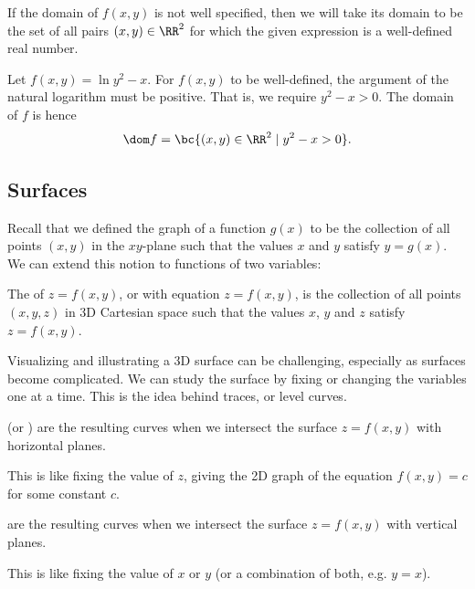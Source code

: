If the domain of $f(x, y)$ is not well specified, then we will take its domain to be the set of all pairs $(x, y) \in \RR^2$ for which the given expression is a well-defined real number.

\begin{example}[Domain of $f(x, y)$]
    Let $f(x, y) = \ln{y^2 - x}$. For $f(x, y)$ to be well-defined, the argument of the natural logarithm must be positive. That is, we require $y^2 - x > 0$. The domain of $f$ is hence \[\dom f = \bc{(x, y) \in \RR^2 \mid y^2 - x > 0}.\]
\end{example}

\subsection{Surfaces}

Recall that we defined the graph of a function $g(x)$ to be the collection of all points $(x, y)$ in the $xy$-plane such that the values $x$ and $y$ satisfy $y = g(x)$. We can extend this notion to functions of two variables:

\begin{definition}
    The  of $z = f(x, y)$, or  with equation $z = f(x, y)$, is the collection of all points $(x, y, z)$ in 3D Cartesian space such that the values $x$, $y$ and $z$ satisfy $z = f(x, y)$.
\end{definition}

Visualizing and illustrating a 3D surface can be challenging, especially as surfaces become complicated. We can study the surface by fixing or changing the variables one at a time. This is the idea behind traces, or level curves.

\begin{definition}
     (or ) are the resulting curves when we intersect the surface $z = f(x, y)$ with horizontal planes.
\end{definition}

This is like fixing the value of $z$, giving the 2D graph of the equation $f(x, y) = c$ for some constant $c$.

\begin{definition}
     are the resulting curves when we intersect the surface $z = f(x, y)$ with vertical planes.
\end{definition}

This is like fixing the value of $x$ or $y$ (or a combination of both, e.g. $y = x$).

